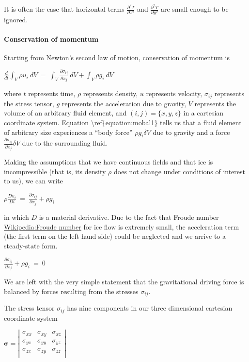 It is often the case that horizontal terms
$\frac{\partial^{2} T}{\partial x^{2}}$ and
$\frac{\partial^{2} T}{\partial y^{2}}$ are small enough to be ignored.

\paragraph{Conservation of momentum}

Starting from Newton's second law of motion, conservation of momentum is

$
\frac{d} {dt} \int_{V}\rho u_{i}~dV ~ = ~ \int_{V} \frac{\partial \sigma_{ij}} {\partial x_{j}} ~dV +  \int_{V} \rho g_{i}~dV
$

where $t$ represents time, $\rho$ represents density, $u$ represents
velocity, $\sigma_{ij}$ represents the stress tensor, $g$ represents the
acceleration due to gravity, $V$ represents the volume of an arbitrary
fluid element, and $(i,j)= \{x, y, z\}$ in a cartesian coordinate
system. Equation \textbackslash{}ref\{equation:mobal1\} tells us that a
fluid element of arbitrary size experiences a ``body force''
$\rho g_{i}\delta V$ due to gravity and a force
$\frac{\partial \sigma_{ij}} {\partial x_{j}} \delta V$ due to the
surrounding fluid.

Making the assumptions that we have continuous fields and that ice is
incompressible (that is, its density $\rho$ does not change under
conditions of interest to us), we can write

$
\rho \frac{D u_{i}}{D t}~=~\frac{\partial \sigma_{ij}}{\partial x_{j}} + \rho g_{i}
$

in which $D$ is a material derivative. Due to the fact that Froude
number \href{Wikipedia:Froude number}{Wikipedia:Froude number} for ice
flow is extremely small, the acceleration term (the first term on the
left hand side) could be neglected and we arrive to a steady-state form.

$
\frac{\partial \sigma_{ij}}{\partial x_{j}} + \rho g_{i} ~=~0
$

We are left with the very simple statement that the gravitational
driving force is balanced by forces resulting from the stresses
$\sigma_{ij}$.

The stress tensor $\sigma_{ij}$ has nine components in our three
dimensional cartesian coordinate system

$
\mathbf{\sigma} =
\left\vert  \begin{array}{ccc} 
    \sigma _{ xx} & \sigma _{ xy} & \sigma _{ xz} \\
    \sigma _{ yx} & \sigma _{ yy} & \sigma _{ yz} \\
    \sigma _{ zx} & \sigma _{ zy} & \sigma _{ zz} \\
\end{array} \right\vert 
$

